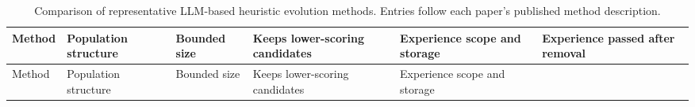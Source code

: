 \documentclass{article}
\begin{document}
\begin{longtable}[]{@{}
  >{\raggedright\arraybackslash}p{}
  >{\raggedright\arraybackslash}p{}
  >{\raggedright\arraybackslash}p{}
  >{\raggedright\arraybackslash}p{}
  >{\raggedright\arraybackslash}p{}
  >{\raggedright\arraybackslash}p{}@{}}
\caption{Comparison of representative LLM-based heuristic evolution methods. Entries follow each paper's published method description.}\tabularnewline
\toprule\noalign{}
\begin{minipage}[b]{\linewidth}\raggedright
Method
\end{minipage} & \begin{minipage}[b]{\linewidth}\raggedright
Population structure
\end{minipage} & \begin{minipage}[b]{\linewidth}\raggedright
Bounded size
\end{minipage} & \begin{minipage}[b]{\linewidth}\raggedright
Keeps lower-scoring candidates
\end{minipage} & \begin{minipage}[b]{\linewidth}\raggedright
Experience scope and storage
\end{minipage} & \begin{minipage}[b]{\linewidth}\raggedright
Experience passed after removal
\end{minipage} \\
\midrule\noalign{}
\endfirsthead
\toprule\noalign{}
\begin{minipage}[b]{\linewidth}\raggedright
Method
\end{minipage} & \begin{minipage}[b]{\linewidth}\raggedright
Population structure
\end{minipage} & \begin{minipage}[b]{\linewidth}\raggedright
Bounded size
\end{minipage} & \begin{minipage}[b]{\linewidth}\raggedright
Keeps lower-scoring candidates
\end{minipage} & \begin{minipage}[b]{\linewidth}\raggedright
Experience scope and storage
\end{minipage} & \begin{minipage}[b]{\linewidth}\raggedright

\end{minipage}
\end{longtable}
\end{document}
